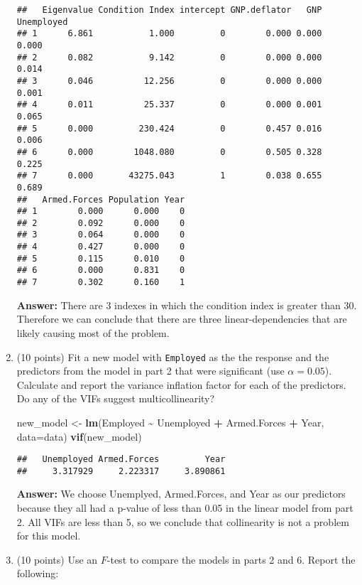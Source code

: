 \documentclass[
]{article}
\newenvironment{Shaded}{\begin{snugshade}}{\end{snugshade}}
\newcommand{\AttributeTok}[1]{\textcolor[rgb]{0.13,0.29,0.53}{#1}}
\newcommand{\FunctionTok}[1]{\textcolor[rgb]{0.13,0.29,0.53}{\textbf{#1}}}
\newcommand{\NormalTok}[1]{#1}
\newcommand{\OtherTok}[1]{\textcolor[rgb]{0.56,0.35,0.01}{#1}}
\newcommand{\SpecialCharTok}[1]{\textcolor[rgb]{0.81,0.36,0.00}{\textbf{#1}}}
\begin{document}
\begin{enumerate}
\begin{verbatim}
##   Eigenvalue Condition Index intercept GNP.deflator   GNP Unemployed
## 1      6.861           1.000         0        0.000 0.000      0.000
## 2      0.082           9.142         0        0.000 0.000      0.014
## 3      0.046          12.256         0        0.000 0.000      0.001
## 4      0.011          25.337         0        0.000 0.001      0.065
## 5      0.000         230.424         0        0.457 0.016      0.006
## 6      0.000        1048.080         0        0.505 0.328      0.225
## 7      0.000       43275.043         1        0.038 0.655      0.689
##   Armed.Forces Population Year
## 1        0.000      0.000    0
## 2        0.092      0.000    0
## 3        0.064      0.000    0
## 4        0.427      0.000    0
## 5        0.115      0.010    0
## 6        0.000      0.831    0
## 7        0.302      0.160    1
\end{verbatim}

  \textbf{Answer:} There are 3 indexes in which the condition index is
  greater than 30. Therefore we can conclude that there are three
  linear-dependencies that are likely causing most of the problem.
\item
  (10 points) Fit a new model with \texttt{Employed} as the the response
  and the predictors from the model in part 2 that were significant (use
  \(\alpha = 0.05\)). Calculate and report the variance inflation factor
  for each of the predictors. Do any of the VIFs suggest
  multicollinearity?

\begin{Shaded}
\begin{Highlighting}[]
\NormalTok{new\_model }\OtherTok{\textless{}{-}} \FunctionTok{lm}\NormalTok{(Employed }\SpecialCharTok{\textasciitilde{}}\NormalTok{ Unemployed }\SpecialCharTok{+}\NormalTok{ Armed.Forces }\SpecialCharTok{+}\NormalTok{ Year, }\AttributeTok{data=}\NormalTok{data)}
\FunctionTok{vif}\NormalTok{(new\_model)}
\end{Highlighting}
\end{Shaded}

\begin{verbatim}
##   Unemployed Armed.Forces         Year 
##     3.317929     2.223317     3.890861
\end{verbatim}

  \textbf{Answer:} We choose Unemplyed, Armed.Forces, and Year as our
  predictors because they all had a p-value of less than 0.05 in the
  linear model from part 2. All VIFs are less than 5, so we conclude
  that collinearity is not a problem for this model.
\item
  (10 points) Use an \(F\)-test to compare the models in parts 2 and 6.
  Report the following:


\end{enumerate}
\end{document}
